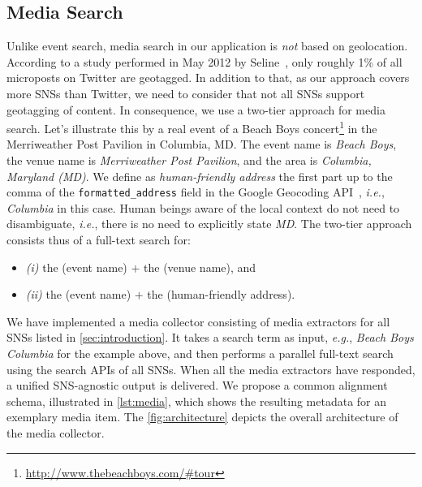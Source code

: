 \documentclass{acm_proc_article-sp}
\let\oldemph\emph
\renewcommand{\emph}[1]{\oldemph{\fontsize{9}{9}\selectfont #1}}
\begin{document}
{\subsection{Media Search} \label{sec:media-search}
Unlike event search, media search in our application is \emph{not} based on geolocation. According to a study performed in May 2012 by Seline~\cite{Quora2012},
only roughly 1\% of all microposts on Twitter are geotagged. In addition to that, as our approach covers more SNSs than Twitter, we need to consider that not all SNSs support geotagging of content. In consequence, we use a two-tier approach for media search. Let's illustrate this by a real event of a Beach Boys concert\footnote{\url{http://www.thebeachboys.com/\#tour}} in the Merriweather Post Pavilion in Columbia, MD. The event name is \emph{Beach Boys},
the venue name is \emph{Merriweather Post Pavilion}, and the area is \emph{Columbia, Maryland (MD)}. We define as \emph{human-friendly address} the first part up to the comma of the \texttt{formatted\_address} field in the Google Geocoding API~\cite{Geocoding2012}, \emph{i.e.}, \emph{Columbia} in this case. Human beings aware of the local context do not need to disambiguate, \emph{i.e.}, there is no need to explicitly state \emph{MD}. The two-tier approach consists thus of a full-text search for:
\begin{itemize}
 \item \emph{(i)} the (event name) $+$ the (venue name), and
 \item \emph{(ii)} the (event name) $+$ the (human-friendly address).
\end{itemize}

We have implemented a media collector consisting of media extractors for all SNSs listed in \autoref{sec:introduction}.
It takes a search term as input, \emph{e.g.}, \emph{Beach Boys Columbia} for the example above, and then performs a parallel full-text search using the search APIs of all SNSs. When all the media extractors have responded, a unified SNS-agnostic output is delivered. We propose a common alignment schema, illustrated in
\autoref{lst:media}, which shows the resulting metadata for an exemplary media item. The \autoref{fig:architecture} depicts the overall architecture of the media collector.

}
\end{document}
